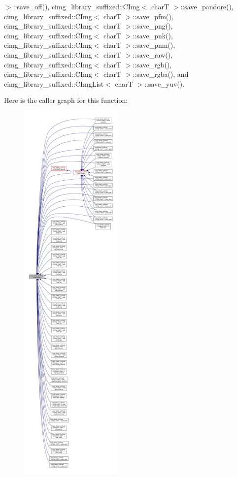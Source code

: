 $>$\+::save\+\_\+off(), cimg\+\_\+library\+\_\+suffixed\+::\+C\+Img$<$ char\+T $>$\+::save\+\_\+pandore(), cimg\+\_\+library\+\_\+suffixed\+::\+C\+Img$<$ char\+T $>$\+::save\+\_\+pfm(), cimg\+\_\+library\+\_\+suffixed\+::\+C\+Img$<$ char\+T $>$\+::save\+\_\+png(), cimg\+\_\+library\+\_\+suffixed\+::\+C\+Img$<$ char\+T $>$\+::save\+\_\+pnk(), cimg\+\_\+library\+\_\+suffixed\+::\+C\+Img$<$ char\+T $>$\+::save\+\_\+pnm(), cimg\+\_\+library\+\_\+suffixed\+::\+C\+Img$<$ char\+T $>$\+::save\+\_\+raw(), cimg\+\_\+library\+\_\+suffixed\+::\+C\+Img$<$ char\+T $>$\+::save\+\_\+rgb(), cimg\+\_\+library\+\_\+suffixed\+::\+C\+Img$<$ char\+T $>$\+::save\+\_\+rgba(), and cimg\+\_\+library\+\_\+suffixed\+::\+C\+Img\+List$<$ char\+T $>$\+::save\+\_\+yuv().

Here is the caller graph for this function\+:
\nopagebreak
\begin{figure}[H]
\begin{center}
\leavevmode
\includegraphics[height=550pt]{d4/d9b/namespacecimg__library__suffixed_1_1cimg_a9aafdb8732ff87625052ce2723f8a516_icgraph}
\end{center}
\end{figure}
\mbox{\label{namespacecimg__library__suffixed_1_1cimg_a6b210044fcdb52b1d649ab19006de4ad}} 

